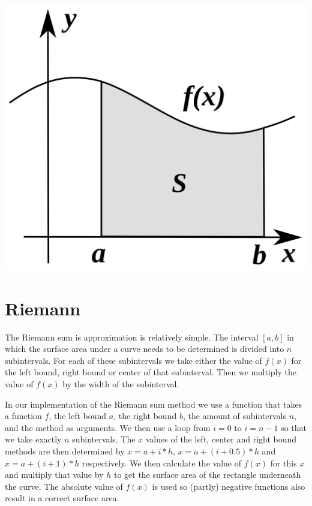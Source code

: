 \documentclass[a4paper,12px]{article}
\begin{document}
\vspace{2cm}
\begin{center}
    \includegraphics[width=(\textwidth/5*3)]{curve}
\end{center}
\clearpage

\tableofcontents
\vspace{5mm}


\section{Riemann}

The Riemann sum is approximation is relatively simple. The interval $[a,b]$ in
which the surface area under a curve needs to be determined is divided into $n$
subintervals. For each of these subintervals we take either the value of $f(x)$
for the left bound, right bound or center of that subinterval. Then we multiply
the value of $f(x)$ by the width of the subinterval.

In our implementation of the Riemann sum method we use a function that takes a
function $f$, the left bound $a$, the right bound $b$, the amount of
subintervals $n$, and the method as arguments. We then use a loop from $i=0$ to
$i=n-1$ so that we take exactly $n$ subintervals. The $x$ values of the left,
center and right bound methods are then determined by $x=a+i*h$, $x=a+(i+0.5)*h$
and $x=a+(i+1)*h$ respectively. We then calculate the value of $f(x)$ for this
$x$ and multiply that value by $h$ to get the surface area of the rectangle
underneath the curve. The absolute value of $f(x)$ is used so (partly) negative
functions also result in a correct surface area.
\end{document}
